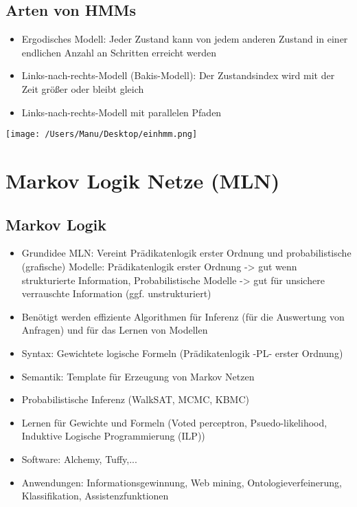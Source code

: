 \documentclass[paper=a4, fontsize=11pt]{scrartcl} %
\numberwithin{equation}{section} %
\numberwithin{figure}{section} %
\numberwithin{table}{section} %
\begin{document}
\subsection{Arten von HMMs}
\begin{itemize}
\item Ergodisches Modell: Jeder Zustand kann von jedem anderen Zustand in einer endlichen Anzahl an Schritten erreicht werden
\item Links-nach-rechts-Modell (Bakis-Modell): Der Zustandsindex wird mit der Zeit größer oder bleibt gleich
\item Links-nach-rechts-Modell mit parallelen Pfaden
\end{itemize}

\texttt{[image: /Users/Manu/Desktop/einhmm.png]}

\section{Markov Logik Netze (MLN)}

\subsection{Markov Logik}

\begin{itemize}
\item Grundidee MLN: Vereint Prädikatenlogik erster Ordnung und probabilistische (grafische) Modelle: Prädikatenlogik erster Ordnung -> gut wenn strukturierte Information, Probabilistische Modelle -> gut für unsichere verrauschte Information (ggf. unstrukturiert)
\item Benötigt werden effiziente Algorithmen für Inferenz (für die Auswertung von Anfragen) und für das Lernen von Modellen
\item Syntax: Gewichtete logische Formeln (Prädikatenlogik -PL- erster Ordnung)
\item Semantik: Template für Erzeugung von Markov Netzen
\item Probabilistische Inferenz (WalkSAT, MCMC, KBMC)
\item Lernen für Gewichte und Formeln (Voted perceptron, Psuedo-likelihood, Induktive Logische Programmierung (ILP))
\item Software: Alchemy, Tuffy,...
\item Anwendungen: Informationsgewinnung, Web mining, Ontologieverfeinerung, Klassifikation, Assistenzfunktionen
\end{itemize}
\end{document}
